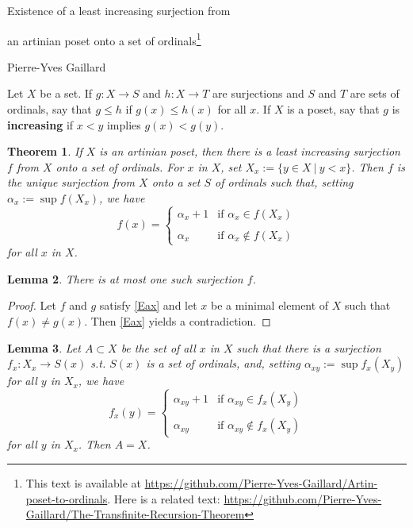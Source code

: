 \documentclass[11pt,letterpaper]{article}
\newtheorem{thm}{Theorem}%
\newtheorem{lem}[thm]{Lemma}
\newcommand{\noi}{\noindent}
\begin{document}
\begin{center}
{\Large Existence of a least increasing surjection from 

an artinian poset onto a set of ordinals\footnote{This text is available at \url{https://github.com/Pierre-Yves-Gaillard/Artin-poset-to-ordinals}. Here is a related text: \url{https://github.com/Pierre-Yves-Gaillard/The-Transfinite-Recursion-Theorem}}}\medskip 

{\small Pierre-Yves Gaillard}
\end{center}

\noi Let $X$ be a set. If $g:X\to S$ and $h:X\to T$ are surjections and $S$ and $T$ are sets of ordinals, say that $g\le h$ if $g(x)\le h(x)$ for all $x$. If $X$ is a poset, say that $g$ is \textbf{increasing} if $x<y$ implies $g(x)<g(y)$. 

\begin{thm}\label{T1}
If $X$ is an artinian poset, then there is a least increasing surjection $f$ from $X$ onto a set of ordinals. For $x$ in $X$, set $X_x:=\{y\in X\ |\ y<x\}$. Then $f$ is the unique surjection from $X$ onto a set $S$ of ordinals such that, setting $\alpha_x:=\sup f(X_x)$, we have 
\begin{equation}\label{Eax}
f(x)=
\begin{cases}
\alpha_x+1&\text{if }\alpha_x\in f(X_x)\\ \\ 
\alpha_x&\text{if }\alpha_x\notin f(X_x)
\end{cases}
\end{equation} 
for all $x$ in $X$. 
\end{thm}

\begin{lem}\label{L2} 
There is at most one such surjection $f$. 
\end{lem} 

\begin{proof}
Let $f$ and $g$ satisfy \eqref{Eax} and let $x$ be a minimal element of $X$ such that $f(x)\ne g(x)$. Then \eqref{Eax} yields a contradiction. 
\end{proof} 

\begin{lem}\label{L3} 
Let $A\subset X$ be the set of all $x$ in $X$ such that there is a surjection $f_x:X_x\to S(x)$ s.t. $S(x)$ is a set of ordinals, and, setting $\alpha_{xy}:=\sup f_x(X_y)$ for all $y$ in $X_x$, we have 
\begin{equation}\label{Eaxy}
f_x(y)=
\begin{cases}
\alpha_{xy}+1&\text{if }\alpha_{xy}\in f_x(X_y)\\ \\ 
\alpha_{xy}&\text{if }\alpha_{xy}\notin f_x(X_y)
\end{cases}
\end{equation} 
for all $y$ in $X_x$. Then $A=X$. 
\end{lem} 
\end{document}
